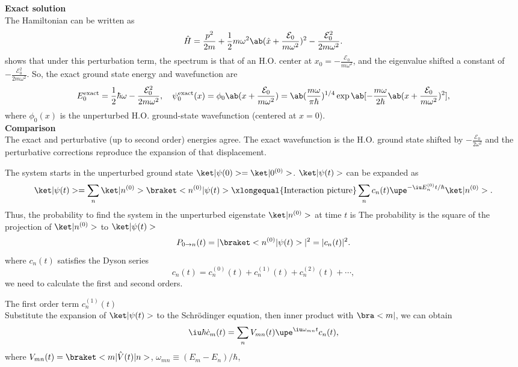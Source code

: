 \begin{solution}
\begin{enumext}
    \textbf{Exact solution}\\
    The Hamiltonian can be written as
    \[
      \hat H = \frac{p^2}{2m} + \frac12m\omega^2\ab(\hat x + \frac{\mathcal E_0}{m\omega^2})^2
    - \frac{\mathcal E_0^2}{2m\omega^2}.
    \]
    shows that under this perturbation term, the spectrum is that of an H.O. center at
    $x_0 = -\frac{\mathcal E_0}{m\omega^2}$, and the eigenvalue shifted a constant of $-\frac{\mathcal E_0^2}{2m\omega^2}$.
    So, the exact ground state energy and wavefunction are
    \[
      E_0^\text{exact} = \frac12\hbar\omega - \frac{\mathcal E_0^2}{2m\omega^2},
      \quad
      \psi_0^\text{exact}(x) = \phi_0\ab(x + \frac{\mathcal E_0}{m\omega^2})
    = \ab(\frac{m\omega}{\pi\hbar})^{1/4}
      \exp\ab[-\frac{m\omega}{2\hbar} \ab(x + \frac{\mathcal E_0}{m\omega^2})^2],
    \]
    where $\phi_0(x)$ is the unperturbed H.O. ground-state wavefunction (centered at $x = 0$).\\
    \textbf{Comparison}\\
    The exact and perturbative (up to second order) energies agree.
    The exact wavefunction is the H.O. ground state shifted by $-\frac{\mathcal E_0}{2\omega^2}$
    and the perturbative corrections reproduce the expansion of that displacement.
    \item The system starts in the unperturbed ground state $\ket|\psi(0)> = \ket|0^{(0)}>$.
    $\ket|\psi(t)>$ can be expanded as
    \[
      \ket|\psi(t)> = \sum_n \ket|n^{(0)}>\braket<n^{(0)}|\psi(t)>
    \xlongequal{\text{Interaction picture}}
      \sum_n c_n(t) \upe^{-\iu E_n^{(0)}t/\hbar} \ket|n^{(0)}>.
    \]
    Thus, the probability to find the system in the unperturbed eigenstate $\ket|n^{(0)}>$
    at time $t$ is The probability is the square of the projection of $\ket|n^{(0)}>$ to $\ket|\psi(t)>$
    \[
      P_{0\to n}(t) = |\braket<n^{(0)}|\psi(t)>|^2 = |c_n(t)|^2.
    \]
    where $c_n(t)$ satisfies the Dyson series
    \[
      c_n(t) = c_n^{(0)}(t) + c_n^{(1)}(t) + c_n^{(2)}(t) + \cdots,
    \]
    we need to calculate the first and second orders.
    \begin{enumext}
      \item The first order term $c_n^{(1)}(t)$\\
      Substitute the expansion of $\ket|\psi(t)>$ to the Schr\"odinger equation,
      then inner product with $\bra<m|$, we can obtain
      \[
        \iu\hbar \dot c_m(t) = \sum_n V_{mn}(t) \upe^{\iu\omega_{mn}t} c_n(t),
      \]
      where $V_{mn}(t) = \braket<m|\hat V(t)|n>$, $\omega_{mn} \equiv (E_m - E_n)/\hbar$,

\end{enumext}
\end{enumext}
\end{solution}
